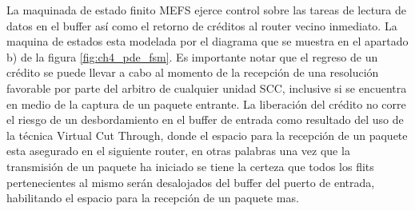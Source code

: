 La maquinada de estado finito MEFS ejerce control sobre las tareas de lectura de datos en el buffer así como el  retorno de créditos al router vecino inmediato. La maquina de estados esta modelada por el diagrama que se muestra en el apartado b) de la figura \ref{fig:ch4_pde_fsm}. Es importante notar que el regreso de un crédito se puede llevar a cabo al momento de la recepción de una resolución favorable por parte del arbitro de cualquier unidad SCC, inclusive si se encuentra en medio de la captura de un paquete entrante. La liberación del crédito no corre el riesgo de un desbordamiento en el buffer de entrada como resultado del uso de la técnica Virtual Cut Through, donde el espacio para la recepción de un paquete esta asegurado en el siguiente router, en otras palabras una vez que la transmisión de un paquete ha iniciado se tiene la certeza que todos los flits pertenecientes al mismo serán desalojados del buffer del puerto de entrada, habilitando el espacio para la recepción de un paquete mas.


